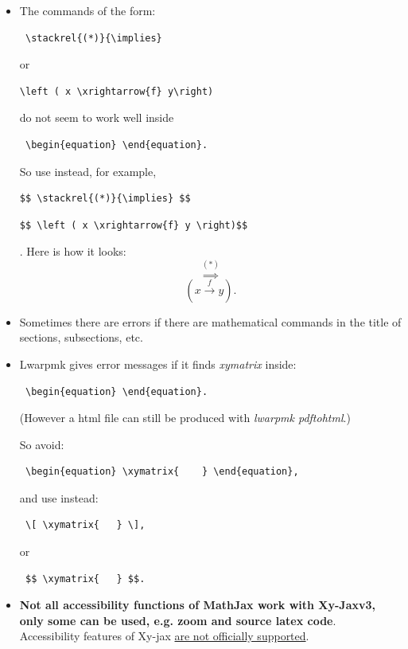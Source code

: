 \documentclass[a4paper,12pt]{article}
\newtheorem{Fundamental Theorem}{Fundamental Theorem}
\begin{document}
\begin{itemize}
\item The commands of the form:
\begin{verbatim} \stackrel{(*)}{\implies} \end{verbatim}
or
\begin{verbatim}\left ( x \xrightarrow{f} y\right) \end{verbatim}
do not seem to work well inside
\begin{verbatim} \begin{equation} \end{equation}. \end{verbatim}
So use instead, for example,
\begin{verbatim}$$ \stackrel{(*)}{\implies} $$ \end{verbatim}
\begin{verbatim}$$ \left ( x \xrightarrow{f} y \right)$$\end{verbatim}.
Here is how it looks:
$$ \stackrel{(*)}{\implies}$$
$$\left ( x \xrightarrow{f} y \right) .$$

\item Sometimes there are errors if there are mathematical commands in the title of sections, subsections, etc.
\item Lwarpmk gives error messages if it finds \textit{xymatrix} inside:
\begin{verbatim} \begin{equation} \end{equation}. \end{verbatim}
(However a html file can still be produced with \textit{lwarpmk pdftohtml}.)

\medskip

\noindent So avoid: \begin{verbatim} \begin{equation} \xymatrix{    } \end{equation}, \end{verbatim}
and use instead:
 \begin{verbatim} \[ \xymatrix{   } \], \end{verbatim}
 or
  \begin{verbatim} $$ \xymatrix{   } $$. \end{verbatim}


  \item  \textbf{Not all accessibility functions of MathJax work with Xy-Jaxv3, only some can be used, e.g. zoom and source latex code}.\\
Accessibility features of  Xy-jax \href{https://github.com/sonoisa/XyJax-v3}{are not  officially supported}.\\


\end{itemize}
\end{document}
